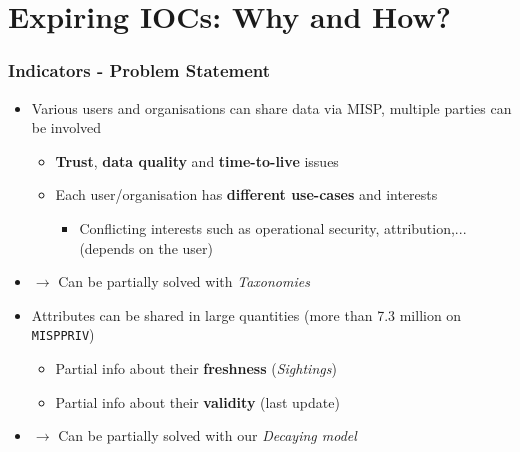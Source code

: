 
\begin{frame}[t,plain]
\titlepage
\end{frame}

\section{Expiring IOCs: Why and How?}
\begin{frame}
\frametitle{Indicators - Problem Statement}
    \begin{itemize}
        \item Various users and organisations can share data via MISP, multiple parties can be involved
        \begin{itemize}
            \item \textbf{Trust}, \textbf{data quality} and \textbf{time-to-live} issues
            \item Each user/organisation has \textbf{different use-cases} and interests
                \begin{itemize}
                    \item Conflicting interests such as operational security, attribution,... (depends on the user)
                \end{itemize}
        \end{itemize}
        \item[] $\rightarrow$ Can be partially solved with \textit{Taxonomies}
        \pause
        \vspace{0.5cm}
        \item Attributes can be shared in large quantities (more than 7.3 million on \texttt{MISPPRIV})
        \begin{itemize}
            \item Partial info about their \textbf{freshness} (\textit{Sightings})
            \item Partial info about their \textbf{validity} (last update)
        \end{itemize}
        \item[] $\rightarrow$ Can be partially solved with our \textit{Decaying model}
    \end{itemize}
\end{frame}


